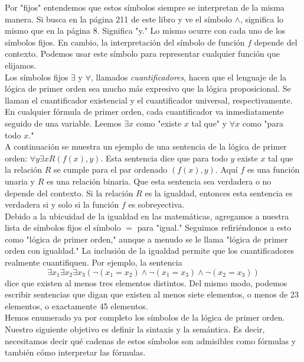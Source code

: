 \message{ !name(main.tex)}\documentclass[12pt,a4paper]{book}
\newcommand{\comillas}[1]{"#1"}
\begin{document}
    Por \comillas{fijos} entendemos que estos símbolos siempre se interpretan de la misma manera. Si busca en la página 211
    de este libro y ve el símbolo $\wedge$, significa lo mismo que en la página 8. Significa \comillas{y.} Lo mismo ocurre
    con cada uno de los símbolos fijos. En cambio, la interpretación del símbolo de función $f$ depende del contexto. Podemos
    usar este símbolo para representar cualquier función que elijamos.\\
    Los símbolos fijos $\exists$ y $\forall$, llamados \textit{cuantificadores}, hacen que el lenguaje de la lógica de primer
    orden sea mucho más expresivo que la lógica proposicional. Se llaman el cuantificador existencial y el cuantificador
    universal, respectivamente. En cualquier fórmula de primer orden, cada cuantificador va inmediatamente seguido de una
    variable. Leemos $\exists x$ como \comillas{existe $x$ tal que} y $\forall x$ como \comillas{para todo $x$.}\\
    A continuación se muestra un ejemplo de una sentencia de la lógica de primer orden: $\forall y\exists xR(f(x),y)$. Esta
    sentencia dice que para todo $y$ existe $x$ tal que la relación $R$ se cumple para el par ordenado $(f(x),y)$. Aquí $f$
    es una función unaria y $R$ es una relación binaria. Que esta sentencia sea verdadera o no depende del contexto. Si la
    relación $R$ es la igualdad, entonces esta sentencia es verdadera si y solo si la función $f$ es sobreyectiva.\\
    Debido a la ubicuidad de la igualdad en las matemáticas, agregamos a nuestra lista de símbolos fijos el símbolo $=$ para
    \comillas{igual.} Seguimos refiriéndonos a esto como \comillas{lógica de primer orden,} aunque a menudo se le llama
    \comillas{lógica de primer orden con igualdad.} La inclusión de la igualdad permite que los cuantificadores realmente
    cuantifiquen. Por ejemplo, la sentencia
    \begin{equation*}
        \exists x_{1}\exists x_{2}\exists x_{3}(\neg(x_{1}=x_{2})\wedge\neg(x_{1}=x_{3})\wedge\neg(x_{2}=x_{3}))
    \end{equation*}
    dice que existen al menos tres elementos distintos. Del mismo modo, podemos escribir sentencias que digan que existen al
    menos siete elementos, o menos de 23 elementos, o exactamente 45 elementos.\\
    Hemos enumerado ya por completo los símbolos de la lógica de primer orden. Nuestro siguiente objetivo es definir la
    sintaxis y la semántica. Es decir, necesitamos decir qué cadenas de estos símbolos son admisibles como fórmulas y
    también cómo interpretar las fórmulas.
\end{document}
